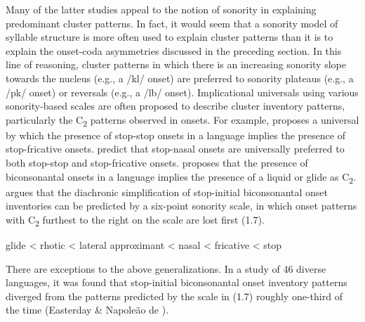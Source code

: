   Many of the latter studies appeal to the notion of sonority in explaining predominant cluster patterns. In fact, it would seem that a sonority model of syllable structure is more often used to explain cluster patterns than it is to explain the onset-coda asymmetries discussed in the preceding section. In this line of reasoning, cluster patterns in which there is an increasing sonority slope towards the nucleus (e.g., a /kl/ onset) are preferred to sonority plateaus (e.g., a /pk/ onset) or reversals (e.g., a /lb/ onset). Implicational universals using various sonority-based scales are often proposed to describe cluster inventory patterns, particularly the C\textsubscript{2} patterns observed in onsets. For example, \citet{Morelli1999} proposes a universal by which the presence of stop-stop onsets in a language implies the presence of stop-fricative onsets. \citet{LennertzBerent2015} predict that stop-nasal onsets are universally preferred to both stop-stop and stop-fricative onsets. \citet{Parker2012} proposes that the presence of biconsonantal onsets in a language implies the presence of a liquid or glide as C\textsubscript{2}. \citet{Vennemann2012} argues that the diachronic simplification of stop-initial biconsonantal onset inventories can be predicted by a six-point sonority scale, in which onset patterns with C\textsubscript{2} furthest to the right on the scale are lost first (1.7).

\ea\label{ex:(1.7)}
  glide < rhotic < lateral approximant < nasal < fricative < stop
\z

  There are exceptions to the above generalizations. In a study of 46 diverse languages, it was found that stop-initial biconsonantal onset inventory patterns diverged from the patterns predicted by the scale in (1.7) roughly one-third of the time (Easterday \& Napoleão de \citealt{Souza2015}). 

